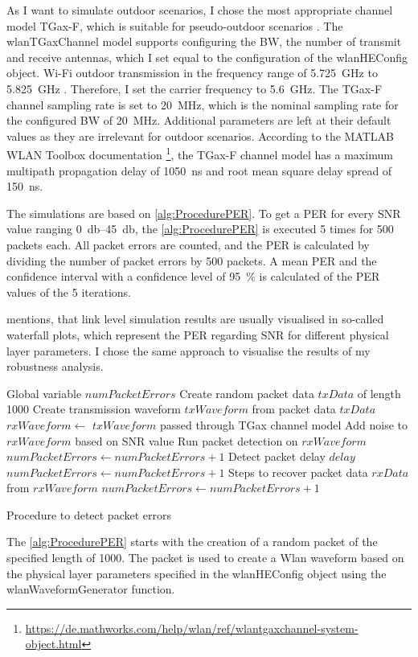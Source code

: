 As I want to simulate outdoor scenarios, I chose the most appropriate channel model TGax-F, which is suitable for pseudo-outdoor scenarios \cite{TGAXCHANNEL}.
The wlanTGaxChannel model supports configuring the \ac{BW}, the number of transmit and receive antennas, which I set equal to the configuration of the wlanHEConfig object.
Wi-Fi outdoor transmission in the frequency range of \SI{5.725}{\giga\hertz} to \SI{5.825}{\giga\hertz} \cite{freq_plan_5G}.
Therefore, I set the carrier frequency to \SI{5.6}{\giga\hertz}.
The TGax-F channel sampling rate is set to \SI{20}{\mega\hertz}, which is the nominal sampling rate for the configured \ac{BW} of \SI{20}{\mega\hertz}.
Additional parameters are left at their default values as they are irrelevant for outdoor scenarios.
According to the MATLAB WLAN Toolbox documentation \footnote{\url{https://de.mathworks.com/help/wlan/ref/wlantgaxchannel-system-object.html}},
the TGax-F channel model has a maximum multipath propagation delay of \SI{1050}{\nano\second} and root mean square delay spread of \SI{150}{\nano\second}.

The simulations are based on \autoref{alg:ProcedurePER}.
To get a \ac{PER} for every \ac{SNR} value ranging \SIrange{0}{45}{\decibel}, the \autoref{alg:ProcedurePER} is executed \num{5} times for \num{500} packets each.
All packet errors are counted, and the \ac{PER} is calculated by dividing the number of packet errors by \num{500} packets.
A mean \ac{PER} and the confidence interval with a confidence level of
\SI{95}{\percent} is calculated of the \ac{PER} values of the \num{5} iterations.

\textcite{omar_survey_2016} mentions, that link level simulation results are usually visualised in so-called waterfall plots, which represent the \ac{PER} regarding \ac{SNR} for
different physical layer parameters.
I chose the same approach to visualise the results of my robustness analysis.

\begin{algorithm}
\begin{algorithmic}[1]
\REQUIRE Global variable $numPacketErrors$
\STATE Create random packet data $txData$ of length \SI{1000}{\byte}
\STATE Create transmission waveform $txWaveform$ from packet data $txData$
\STATE $rxWaveform \gets $ $txWaveform$ passed through TGax channel model
\STATE Add noise to $rxWaveform$ based on \ac{SNR} value
\STATE Run packet detection on $rxWaveform$
    \STATE $numPacketErrors \gets numPacketErrors + 1$
\ENDIF
\STATE Detect packet delay $delay$
    \STATE $numPacketErrors \gets numPacketErrors + 1$
\ENDIF
\STATE Steps to recover packet data $rxData$ from $rxWaveform$
    \STATE $numPacketErrors \gets numPacketErrors + 1$
\ENDIF
\end{algorithmic}
\caption{Procedure to detect packet errors}
\label{alg:ProcedurePER}
\end{algorithm}
The \autoref{alg:ProcedurePER} starts with the creation of a random packet of the specified length of \SI{1000}{\byte}.
The packet is used to create a Wlan waveform based on the physical layer parameters specified in the wlanHEConfig object using the wlanWaveformGenerator function.

